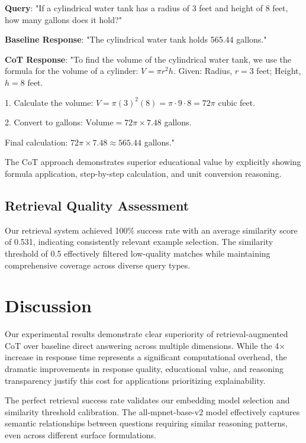 \documentclass{article}
\begin{document}
\textbf{Query}: "If a cylindrical water tank has a radius of 3 feet and height of 8 feet, how many gallons does it hold?"

\textbf{Baseline Response}: "The cylindrical water tank holds 565.44 gallons."

\textbf{CoT Response}: "To find the volume of the cylindrical water tank, we use the formula for the volume of a cylinder: \( V = \pi r^2 h \). Given: Radius, \( r = 3 \) feet; Height, \( h = 8 \) feet.

1. Calculate the volume:
\( V = \pi (3)^2 (8) = \pi \cdot 9 \cdot 8 = 72\pi \) cubic feet.

2. Convert to gallons:
\( \text{Volume} = 72\pi \times 7.48 \) gallons.

Final calculation:
\( 72\pi \times 7.48 \approx 565.44 \) gallons."


The CoT approach demonstrates superior educational value by explicitly showing formula application, step-by-step calculation, and unit conversion reasoning.

\subsection{Retrieval Quality Assessment}

Our retrieval system achieved 100\% success rate with an average similarity score of 0.531, indicating consistently relevant example selection. The similarity threshold of 0.5 effectively filtered low-quality matches while maintaining comprehensive coverage across diverse query types.

\section{Discussion}

Our experimental results demonstrate clear superiority of retrieval-augmented CoT over baseline direct answering across multiple dimensions. While the 4× increase in response time represents a significant computational overhead, the dramatic improvements in response quality, educational value, and reasoning transparency justify this cost for applications prioritizing explainability.

The perfect retrieval success rate validates our embedding model selection and similarity threshold calibration. The all-mpnet-base-v2 model effectively captures semantic relationships between questions requiring similar reasoning patterns, even across different surface formulations.
\end{document}
